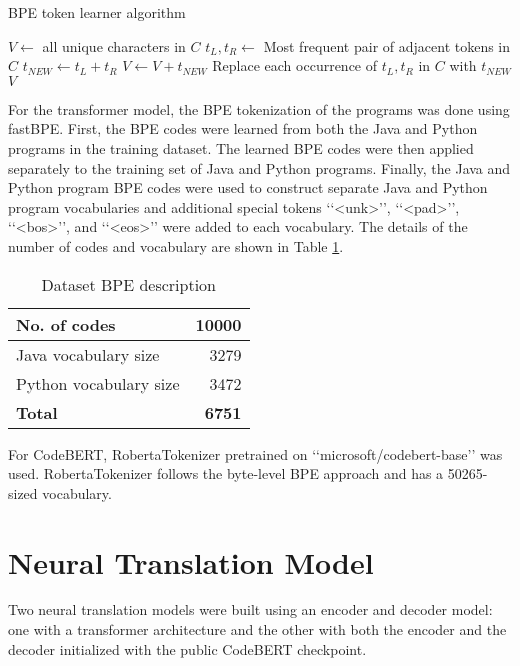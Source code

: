 {\begin{algorithm}[H]
\caption{BPE token learner algorithm}
\begin{algorithmic}[1]
\State $V \gets $ all unique characters in $C$ 
 
\State $t_L, t_R \gets $ Most frequent pair of adjacent tokens in $C$
\State $t_{NEW} \gets t_L + t_R$ 
\State $V \gets V + t_{NEW}$ 
\State Replace each occurrence of $t_L, t_R$ in $C$ with $t_{NEW}$ 
\EndFor
\State\Return $V$
\EndFunction
\end{algorithmic}
\end{algorithm}

For the transformer model, the BPE tokenization of the programs was done using fastBPE.  First, the BPE codes were learned from both the Java and Python programs in the training dataset. The learned BPE codes were then applied separately to the training set of Java and Python programs. Finally, the Java and Python program BPE codes were used to construct separate Java and Python program vocabularies and additional special tokens {\lq\lq <unk>\rq\rq}, {\lq\lq <pad>\rq\rq}, {\lq\lq <bos>\rq\rq}, and {\lq\lq <eos>\rq\rq} were added to each vocabulary. The details of the number of codes and vocabulary are shown in Table \ref{table:4.2}.
\begin{table}[H]
\centering
\def\arraystretch{1.25}
\caption{Dataset BPE description}
\label{table:4.2}
\begin{tabular}{|l|r|} \hline
No. of codes & 10000 \\ \hline
Java vocabulary size & 3279 \\ \hline
Python vocabulary size & 3472 \\ \hline
\textbf{Total} & \textbf{6751} \\ \hline
\end{tabular}
\end{table}

For CodeBERT, RobertaTokenizer pretrained on {\lq\lq microsoft/codebert-base\rq\rq} was used. RobertaTokenizer follows the byte-level BPE approach and has a 50265-sized vocabulary.

\section{Neural Translation Model}
Two neural translation models were built using an encoder and decoder model: one with a transformer architecture and the other with both the encoder and the decoder initialized with the public CodeBERT checkpoint.

}
